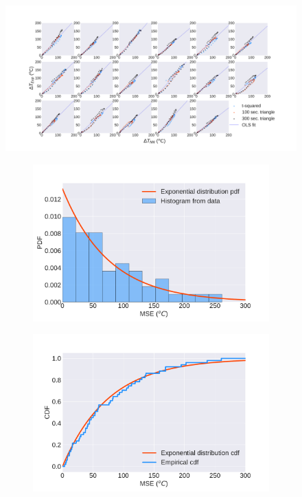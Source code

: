 \documentclass{article}
\begin{document}
\begin{figure}[htb] \centering
\includegraphics[width=.9\textwidth]{figures/fds_vs_reality.pdf}
\caption{}
\label{fig:fds_vs_reality}
\end{figure}

\begin{figure}[htbp]
  \centering
  \begin{subfigure}[t]{.45\textwidth}
      \centering
      \includegraphics[width=\textwidth,keepaspectratio]{figures/misfit_pdf.pdf}
      \caption{}
      \label{fig:misfit_pdf}
  \end{subfigure}
  \begin{subfigure}[t]{.45\textwidth}
      \centering
      \includegraphics[width=\textwidth ,keepaspectratio]{figures/misfit_cdf.pdf}
      \caption{}
      \label{fig:misfit_cdf}
  \end{subfigure}
  \caption{} 
  \label{fig:misfit_distribution}
\end{figure}
\end{document}
